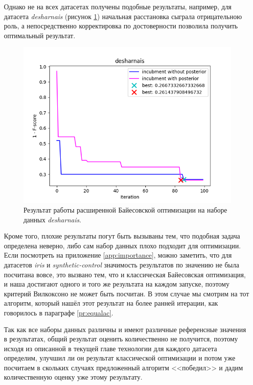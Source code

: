 \documentclass[times,specification,annotation]{itmo-student-thesis}
\begin{document}
	Однако не на всех датасетах получены подобные результаты, например, для датасета \textit{desharnais} (рисунок \ref{img:pbo-desharnais}) начальная расстановка сыграла отрицательною роль, а непосредственно корректировка по достоверности позволила получить оптимальный результат.
	\begin{figure}[!ht]
		\caption{Результат работы расширенной Байесовской оптимизации на наборе данных \textit{desharnais}.}\label{img:pbo-desharnais}
		\includegraphics[width=0.85\linewidth]{../png/incubment-iteration-posterior/desharnais}
		\centering
	\end{figure} \par 

	Кроме того, плохие результаты погут быть вызываны тем, что подобная задача определена неверно, либо сам набор данных плохо подходит для оптимизации. Если посмотреть на приложение \ref{app:importance}, можно заметить, что для датасетов \textit{iris} и \textit{synthetic-control} значимость результатов по значению не была посчитана вовсе, это вызвано тем, что и классическая Байесовская оптимизация, и наша достигают одного и того же результата на каждом запуске, поэтому критерий Вилкоксоно не может быть посчитан. В этом случае мы смотрим на тот алгоритм, который нашёл этот результат на более ранней итерации, как говорилось в параграфе \ref{pr:equalac}.
	\par 
	
	Так как все наборы данных различны и имеют различные референсные значения в результатах, общий результат оценить количественно не получится, поэтому исходя из описанной в текущей главе технологии для каждого датасета определим, улучшил ли он результат классической оптимизации и потом уже посчитаем в скольких случаях предложенный алгоритм <<победил>> и дадим количественную оценку уже этому результату.
	\par 
	
\end{document}
